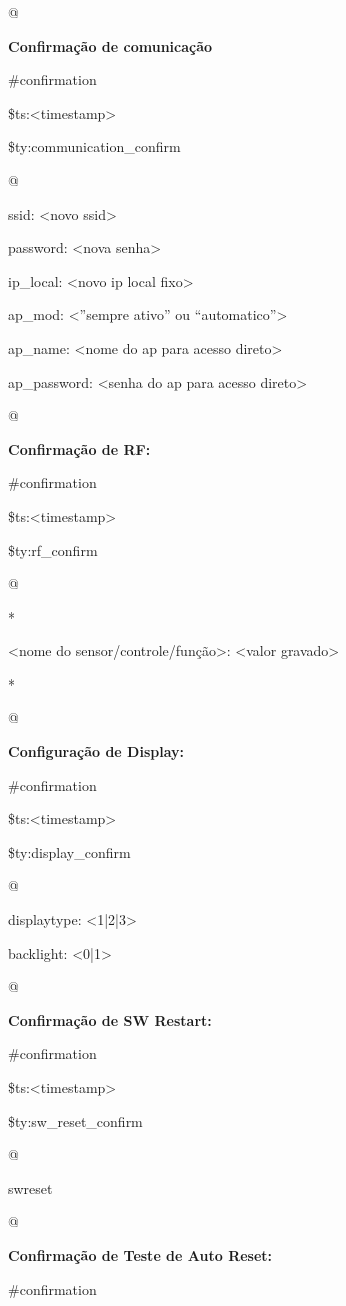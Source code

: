 @

\textbf{Confirmação de comunicação}

\#confirmation

\$ts:\textless timestamp\textgreater

\$ty:communication\_confirm

@

ssid: \textless novo ssid\textgreater

password: \textless nova senha\textgreater

ip\_local: \textless novo ip local fixo\textgreater

ap\_mod: \textless ”sempre ativo” ou “automatico”\textgreater

ap\_name: \textless nome do ap para acesso direto\textgreater

ap\_password: \textless senha do ap para acesso direto\textgreater

@

\textbf{Confirmação de RF:}

\#confirmation

\$ts:\textless timestamp\textgreater

\$ty:rf\_confirm

@

*

\textless nome do sensor/controle/função\textgreater : \textless valor gravado\textgreater

*

@

\textbf{Configuração de Display:}

\#confirmation

\$ts:\textless timestamp\textgreater

\$ty:display\_confirm

@

displaytype: \textless 1|2|3\textgreater

backlight: \textless 0|1\textgreater

@

\textbf{Confirmação de SW Restart:}

\#confirmation

\$ts:\textless timestamp\textgreater

\$ty:sw\_reset\_confirm

@

swreset

@

\textbf{Confirmação de Teste de Auto Reset:}

\#confirmation

